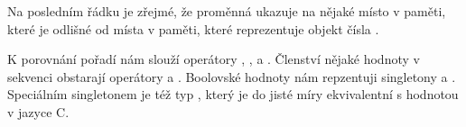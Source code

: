 Na posledním řádku je zřejmé, že proměnná  ukazuje na nějaké místo v paměti, které je odlišné od místa v paměti,
které reprezentuje objekt čísla .

K porovnání pořadí nám slouží operátory \kod{<}, \kod{>}, \kod{<=} a \kod{>=}.
%
Členství nějaké hodnoty v sekvenci obstarají operátory  a .
%
Boolovské hodnoty nám repzentuji singletony  a .
%
Speciálním singletonem je též typ , který je do jisté míry ekvivalentní s hodnotou 
v jazyce C.




